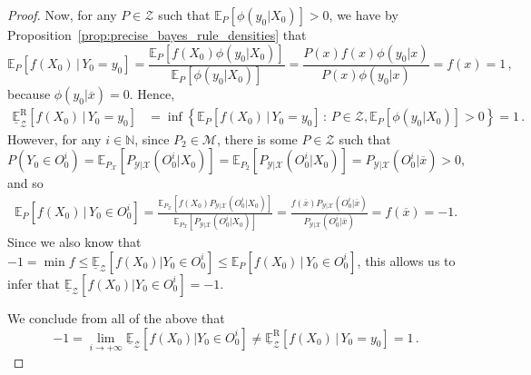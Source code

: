 \documentclass[twoside,11pt]{article}
\newcommand{\nats}{\mathbb{N}}
\newcommand{\states}{\mathcal{X}}
\newcommand{\observs}{\mathcal{Y}}
\begin{document}
\begin{proof}
Now, for any $P\in\mathcal{Z}$ such that $\mathbb{E}_{P}[\phi(y_0\vert X_0)]>0$, we have by Proposition~\ref{prop:precise_bayes_rule_densities} that
\begin{equation*}
\mathbb{E}_{P}[f(X_0)\,\vert\,Y_0=y_0] = \frac{\mathbb{E}_{P}[f(X_0)\phi(y_0\vert X_0)]}{\mathbb{E}_{P}[\phi(y_0\vert X_0)]} = \frac{P(x)f(x)\phi(y_0\vert x)}{P(x)\phi(y_0\vert x)} = f(x) = 1\,,
\end{equation*}
because $\phi(y_0\vert \overline{x})=0$. Hence,
\begin{align*}
\underline{\mathbb{E}}_\mathcal{Z}^\mathrm{R}[f(X_0)\,\vert\, Y_0=y_0] &= \inf\left\{ \mathbb{E}_{P}[f(X_0)\,\vert\,Y_0=y_0]\,:\,P\in\mathcal{Z}, \mathbb{E}_{P}[\phi(y_0\vert X_0)]>0  \right\} = 1\,.
\end{align*}
However, for any $i\in\nats$, since $P_2\in\mathcal{M}$, there is some $P\in\mathcal{Z}$ such that %
\begin{equation*}
P(Y_0\in O_0^i)=\mathbb{E}_{P_\states}[P_{\observs\vert\states}(O_0^i\vert X_0)]=\mathbb{E}_{P_2}[P_{\observs\vert\states}(O_0^i\vert X_0)]=P_{\observs\vert\states}(O_0^i\vert \overline{x})>0,
\end{equation*}
and so
\begin{align*}
\mathbb{E}_{P}[f(X_0)\,\vert\,Y_0\in O_0^i] = \frac{\mathbb{E}_{P_\states}[f(X_0)P_{\observs\vert\states}(O_0^i\vert X_0)]}{\mathbb{E}_{P_\states}[P_{\observs\vert\states}(O_0^i\vert X_0)]} = \frac{f(\overline{x})P_{\observs\vert\states}(O_0^i\vert \overline{x})}{P_{\observs\vert\states}(O_0^i\vert \overline{x})} = f(\overline{x}) = -1.
\end{align*}
Since we also know that $-1=\min f \leq \underline{\mathbb{E}}_\mathcal{Z}[f(X_0)\vert Y_0\in O_0^i] \leq \mathbb{E}_{P}[f(X_0)\,\vert\,Y_0\in O_0^i]$, this allows us to infer that $\underline{\mathbb{E}}_\mathcal{Z}[f(X_0)\vert Y_0\in O_0^i]=-1$.

We conclude from all of the above that
\begin{equation*}
-1 =  \lim_{i\to+\infty} \underline{\mathbb{E}}_\mathcal{Z}[f(X_0)\vert Y_0\in O_0^i] \neq \underline{\mathbb{E}}_\mathcal{Z}^\mathrm{R}[f(X_0)\,\vert\, Y_0=y_0] = 1\,.
\end{equation*}
\end{proof}
\end{document}
